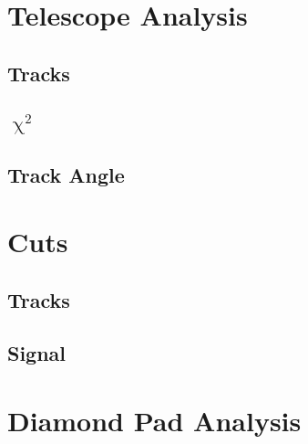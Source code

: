 \documentclass[9pt]{beamer}
\begin{document}
\section{Telescope Analysis}
\subsection{Tracks}
\begin{frame}
\end{frame}
\subsection{$\upchi^{2}$}
\begin{frame}
\end{frame}
\subsection{Track Angle}
\begin{frame}
\end{frame}
\section{Cuts}
\subsection{Tracks}
\begin{frame}
\end{frame}
\subsection{Signal}
\begin{frame}
\end{frame}
\section{Diamond Pad Analysis}
\end{document}
